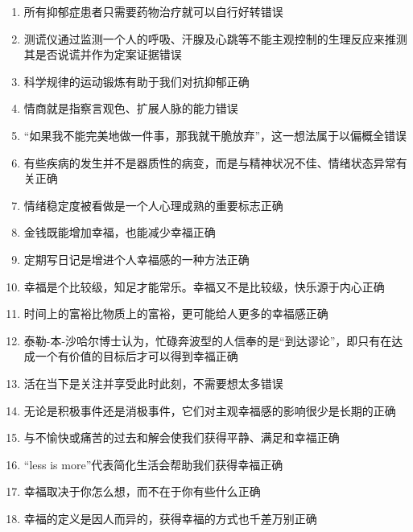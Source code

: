 \documentclass{article}
\begin{document}
\begin{enumerate}
		\item 所有抑郁症患者只需要药物治疗就可以自行好转\hfill 错误
		
		\item 测谎仪通过监测一个人的呼吸、汗腺及心跳等不能主观控制的生理反应来推测其是否说谎并作为定案证据\hfill 错误
		
		\item 科学规律的运动锻炼有助于我们对抗抑郁\hfill 正确
		
		\item 情商就是指察言观色、扩展人脉的能力\hfill 错误
		
		\item “如果我不能完美地做一件事，那我就干脆放弃”，这一想法属于以偏概全\hfill 错误
		
		\item 有些疾病的发生并不是器质性的病变，而是与精神状况不佳、情绪状态异常有关\hfill 正确
		
		\item 情绪稳定度被看做是一个人心理成熟的重要标志\hfill 正确
		
		\item 金钱既能增加幸福，也能减少幸福\hfill 正确
		
		\item 定期写日记是增进个人幸福感的一种方法\hfill 正确
		
		\item 幸福是个比较级，知足才能常乐。幸福又不是比较级，快乐源于内心\hfill 正确
		
		\item 时间上的富裕比物质上的富裕，更可能给人更多的幸福感\hfill 正确
		
		\item 泰勒-本-沙哈尔博士认为，忙碌奔波型的人信奉的是“到达谬论”，即只有在达成一个有价值的目标后才可以得到幸福\hfill 正确 
		
		\item 活在当下是关注并享受此时此刻，不需要想太多\hfill 错误
		
		\item 无论是积极事件还是消极事件，它们对主观幸福感的影响很少是长期的\hfill 正确
		
		\item 与不愉快或痛苦的过去和解会使我们获得平静、满足和幸福\hfill 正确
		
		\item “less is more”代表简化生活会帮助我们获得幸福\hfill 正确
		
		\item 幸福取决于你怎么想，而不在于你有些什么\hfill 正确
		
		\item 幸福的定义是因人而异的，获得幸福的方式也千差万别\hfill 正确
	\end{enumerate}
\end{document}
